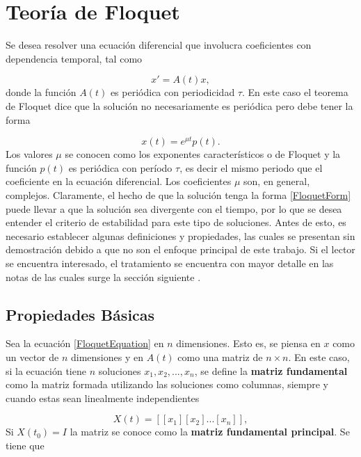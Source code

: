 \documentclass[10pt,a4paper]{report}
\begin{document}
\section{Teoría de Floquet}

Se desea resolver una ecuación diferencial que involucra coeficientes con dependencia temporal, tal como

\begin{equation}\label{FloquetEquation}
x' = A(t)x,
\end{equation} donde la función $A(t)$ es periódica con periodicidad $\tau$. En este caso el teorema de Floquet\cite{WardFT} dice que la solución no necesariamente es periódica pero debe tener la forma

\begin{equation}\label{FloquetForm}
x(t)=e^{\mu t}p(t).
\end{equation} Los valores $\mu$ se conocen como los exponentes característicos o de Floquet y la función $p(t)$ es periódica con período $\tau$, es decir el mismo periodo que el coeficiente en la ecuación diferencial. Los coeficientes $\mu$ son, en general, complejos. Claramente, el hecho de que la solución tenga la forma \eqref{FloquetForm} puede llevar a que la solución sea divergente con el tiempo, por lo que se desea entender el criterio de estabilidad para este tipo de soluciones. Antes de esto, es necesario establecer algunas definiciones y propiedades, las cuales se presentan sin demostración debido a que no son el enfoque principal de este trabajo. Si el lector se encuentra interesado, el tratamiento se encuentra con mayor detalle en las notas de las cuales surge la sección siguiente \cite{WardFT}.

\subsection{Propiedades Básicas}

Sea la ecuación \eqref{FloquetEquation} en $n$ dimensiones. Esto es,
se piensa en $x$ como un vector de $n$ dimensiones y en $A(t)$ como
una matriz de $n \times n$. En este caso, si la ecuación tiene $n$
soluciones $x_1, x_2, ... , x_n$, se define la \textbf{matriz
  fundamental} como la matriz formada utilizando las soluciones como
columnas, siempre y cuando estas sean linealmente independientes

\begin{equation}
X(t) = [[x_1][x_2]...[x_n]],
\end{equation}Si $X(t_0) = I$ la matriz se conoce como la \textbf{matriz fundamental principal}. Se tiene que
\end{document}

